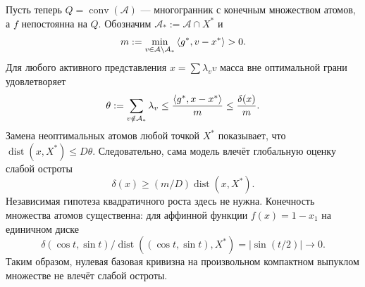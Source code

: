 Пусть теперь $Q=\operatorname{conv}(\mathcal A)$ — многогранник
с конечным множеством атомов, а $f$ непостоянна на $Q$.
Обозначим $\mathcal A_*:=\mathcal A\cap X^*$ и
\begin{equation}\label{eq:atommargin}
 m:=\min_{v\in\mathcal A\setminus\mathcal A_*}
              \left\langle g^*,v-x^*\right\rangle>0.
\end{equation}
Для любого активного представления $x=\sum\lambda_vv$ масса вне
оптимальной грани удовлетворяет
\begin{equation}\label{eq:badmass}
 \theta:=\sum_{v\notin\mathcal A_*}\lambda_v
 \le\frac{\left\langle g^*,x-x^*\right\rangle}m\le\frac{\delta(x)}m.
\end{equation}
Замена неоптимальных атомов любой точкой $X^*$ показывает, что
$\operatorname{dist}(x,X^*)\le D\theta$. Следовательно, сама
модель влечёт глобальную оценку слабой остроты
\[
 \delta(x)\ge(m/D)\operatorname{dist}(x,X^*).
\]
Независимая гипотеза квадратичного роста здесь не нужна.
Конечность множества атомов существенна: для аффинной функции
$f(x)=1-x_1$ на единичном диске
\[
\delta(\cos t,\sin t)/\operatorname{dist}((\cos t,\sin t),X^*)
=|\sin(t/2)|\to0.
\]
Таким образом, нулевая базовая кривизна на
произвольном компактном выпуклом множестве не влечёт слабой остроты.

